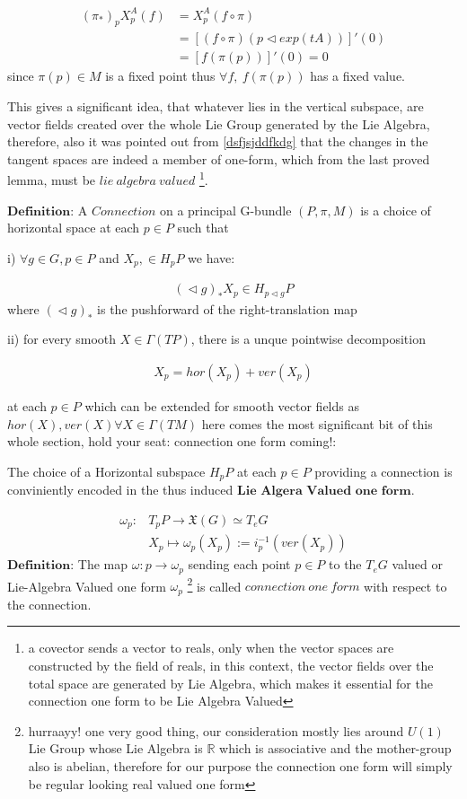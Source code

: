 \documentclass[8pt, twocoloumn]{article}
\begin{document}
 \begin{align}
 {({\pi}_{*})}_p X^A_p (f) &= X^A_p(f \circ \pi) \\ 
 &= [(f \circ \pi)(p \vartriangleleft exp(tA))]'(0) \\
 &= [f(\pi(p))]'(0) = 0
  \end{align}
since $\pi(p) \in M$ is a fixed point thus $\forall f, \ f(\pi(p))$ has a fixed value.

This gives a significant idea, that whatever lies in the vertical subspace, are vector fields created over the whole Lie Group generated by the Lie Algebra, therefore, also it was pointed out from \ref{dsfjsjddfkdg} that the changes in the tangent spaces are indeed a member of one-form, which from the last proved lemma, must be $lie \ algebra \ valued$ \footnote{a covector sends a vector to reals, only when the vector spaces are constructed by the field of reals, in this context, the vector fields over the total space are generated by Lie Algebra, which makes it essential for the connection one form to be Lie Algebra Valued}. 

$\textbf{Definition:}$ A $Connection$ on a principal G-bundle $(P, \pi, M)$ is a choice of horizontal space at each $p\in P$ such that

i) $\forall g \in G, p\in P$ and $X_p, \in H_pP$ we have:

\begin{align}
{(\vartriangleleft g)}_{*}X_p \in H_{p \vartriangleleft g}P
\end{align}
where ${(\vartriangleleft g)}_{*}$ is the pushforward of the right-translation map

ii) for every smooth $X \in \Gamma(TP)$, there is a unque pointwise decomposition

\begin{align}
X_p = hor(X_p) + ver(X_p)
\end{align}

at each $p \in P$ which can be extended for smooth vector fields as $hor(X),ver (X) \forall X \in \Gamma(TM)$
here comes the most significant bit of this whole section, hold your seat: connection one form coming!:

The choice of  a Horizontal subspace $H_pP$ at each $p \in P$ providing a connection is conviniently encoded in the thus induced $\textbf{Lie Algera Valued one form}$.

\begin{align}
\omega_p :& T_pP \to \mathfrak{X}(G) \simeq T_eG \\ 
& X_p \mapsto \omega_p(X_p):= i_p^{-1}(ver(X_p))
\end{align}
$\textbf{Definition:}$ The map $\omega: p \to \omega_p$ sending each point $p \in P$ to the $T_eG $ valued or Lie-Algebra Valued one form $\omega_p$ \footnote{hurraayy! one very good thing, our consideration mostly lies around $U(1)$ Lie Group whose Lie Algebra is $\mathbb{R}$ which is associative and the mother-group also is abelian, therefore for our purpose the connection one form will simply be regular looking real valued one form} is called $connection \ one \ form$ with respect to the connection.
\end{document}
